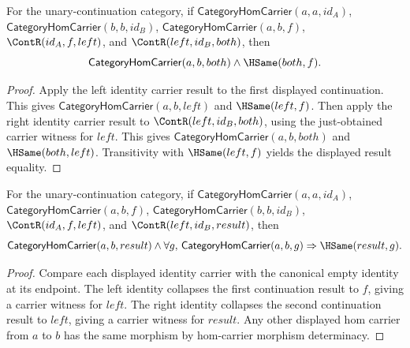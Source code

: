 \begin{theorem}
\label{thm:category-hom-carrier-comp-left-right-identity-result}
For the unary-continuation category, if
$\mathsf{CategoryHomCarrier}(a,a,id_A)$,
$\mathsf{CategoryHomCarrier}(b,b,id_B)$,
$\mathsf{CategoryHomCarrier}(a,b,f)$,
$\ContR(id_A,f,left)$, and $\ContR(left,id_B,both)$, then
$$
\mathsf{CategoryHomCarrier}(a,b,both)\wedge\HSame(both,f).
$$
\end{theorem}
\begin{proof}
Apply the left identity carrier result to the first displayed continuation.
This gives $\mathsf{CategoryHomCarrier}(a,b,left)$ and
$\HSame(left,f)$. Then apply the right identity carrier result to
$\ContR(left,id_B,both)$, using the just-obtained carrier witness for
$left$. This gives $\mathsf{CategoryHomCarrier}(a,b,both)$ and
$\HSame(both,left)$. Transitivity with $\HSame(left,f)$ yields the displayed
result equality.
\end{proof}

\begin{theorem}
\label{thm:category-comp-left-right-identity-public-readback}
For the unary-continuation category, if
$\mathsf{CategoryHomCarrier}(a,a,id_A)$,
$\mathsf{CategoryHomCarrier}(a,b,f)$,
$\mathsf{CategoryHomCarrier}(b,b,id_B)$,
$\ContR(id_A,f,left)$, and $\ContR(left,id_B,result)$, then
$$
\mathsf{CategoryHomCarrier}(a,b,result)\wedge
\forall g,\,
\mathsf{CategoryHomCarrier}(a,b,g)\Rightarrow\HSame(result,g).
$$
\end{theorem}
\begin{proof}
Compare each displayed identity carrier with the canonical empty identity at
its endpoint. The left identity collapses the first continuation result to
$f$, giving a carrier witness for $left$. The right identity collapses the
second continuation result to $left$, giving a carrier witness for $result$.
Any other displayed hom carrier from $a$ to $b$ has the same morphism by
hom-carrier morphism determinacy.
\end{proof}

